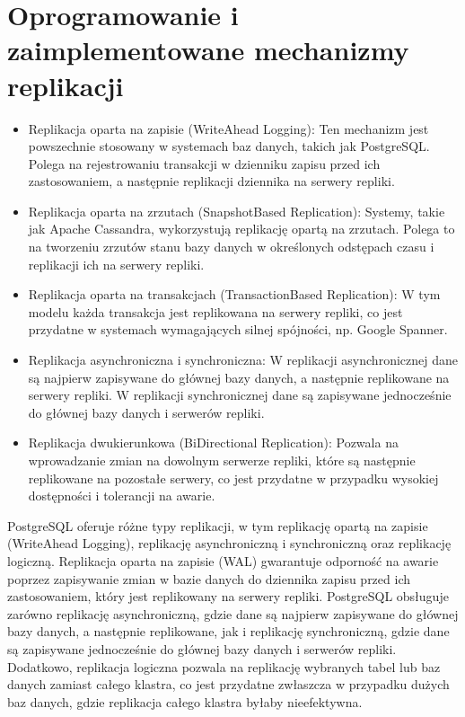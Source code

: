 \documentclass[letterpaper,10pt,polish]{sphinxmanual}
\begin{document}
\section{Oprogramowanie i zaimplementowane mechanizmy replikacji}
\label{\detokenize{rozdzialy/rozdzial5:oprogramowanie-i-zaimplementowane-mechanizmy-replikacji}}\begin{itemize}
\item {} 
\sphinxAtStartPar
Replikacja oparta na zapisie (Write\sphinxhyphen{}Ahead Logging): Ten mechanizm jest powszechnie stosowany w systemach baz danych, takich jak PostgreSQL. Polega na rejestrowaniu transakcji w dzienniku zapisu przed ich zastosowaniem, a następnie replikacji dziennika na serwery repliki.

\item {} 
\sphinxAtStartPar
Replikacja oparta na zrzutach (Snapshot\sphinxhyphen{}Based Replication): Systemy, takie jak Apache Cassandra, wykorzystują replikację opartą na zrzutach. Polega to na tworzeniu zrzutów stanu bazy danych w określonych odstępach czasu i replikacji ich na serwery repliki.

\item {} 
\sphinxAtStartPar
Replikacja oparta na transakcjach (Transaction\sphinxhyphen{}Based Replication): W tym modelu każda transakcja jest replikowana na serwery repliki, co jest przydatne w systemach wymagających silnej spójności, np. Google Spanner.

\item {} 
\sphinxAtStartPar
Replikacja asynchroniczna i synchroniczna: W replikacji asynchronicznej dane są najpierw zapisywane do głównej bazy danych, a następnie replikowane na serwery repliki. W replikacji synchronicznej dane są zapisywane jednocześnie do głównej bazy danych i serwerów repliki.

\item {} 
\sphinxAtStartPar
Replikacja dwukierunkowa (Bi\sphinxhyphen{}Directional Replication): Pozwala na wprowadzanie zmian na dowolnym serwerze repliki, które są następnie replikowane na pozostałe serwery, co jest przydatne w przypadku wysokiej dostępności i tolerancji na awarie.

\end{itemize}

\sphinxAtStartPar
PostgreSQL oferuje różne typy replikacji, w tym replikację opartą na zapisie (Write\sphinxhyphen{}Ahead Logging), replikację asynchroniczną i synchroniczną oraz replikację logiczną. Replikacja oparta na zapisie (WAL) gwarantuje odporność na awarie poprzez zapisywanie zmian w bazie danych do dziennika zapisu przed ich zastosowaniem, który jest replikowany na serwery repliki. PostgreSQL obsługuje zarówno replikację asynchroniczną, gdzie dane są najpierw zapisywane do głównej bazy danych, a następnie replikowane, jak i replikację synchroniczną, gdzie dane są zapisywane jednocześnie do głównej bazy danych i serwerów repliki. Dodatkowo, replikacja logiczna pozwala na replikację wybranych tabel lub baz danych zamiast całego klastra, co jest przydatne zwłaszcza w przypadku dużych baz danych, gdzie replikacja całego klastra byłaby nieefektywna.
\end{document}
